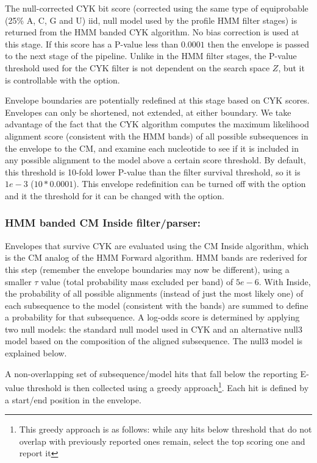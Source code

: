 \begin{sreoutput}
The null-corrected CYK bit score (corrected using the same type of
equiprobable (25\% A, C, G and U) iid, null model used by the profile
HMM filter stages) is returned from the HMM banded CYK algorithm. No
bias correction is used at this stage. If this score has a P-value
less than $0.0001$ then the envelope is passed to the next stage of
the pipeline. Unlike in the HMM filter stages, the P-value threshold
used for the CYK filter is not dependent on the search space $Z$, but
it is controllable with the  option.

Envelope boundaries are potentially redefined at this stage based on
CYK scores. Envelopes can only be shortened, not extended, at either
boundary. We take advantage of the fact that the CYK algorithm
computes the maximum likelihood alignment score (consistent with the
HMM bands) of all possible subsequences in the envelope to the CM, and
examine each nucleotide to see if it is included in any possible
alignment to the model above a certain score threshold. By default,
this threshold is 10-fold lower P-value than the filter survival
threshold, so it is $1e-3$ ($10*0.0001$). This envelope redefinition
can be turned off with the  option and it the
threshold for it can be changed with the  option.

\subsubsection{HMM banded CM Inside filter/parser:}

Envelopes that survive CYK are evaluated using the CM Inside
algorithm, which is the CM analog of the HMM Forward algorithm. HMM
bands are rederived for this step (remember the envelope boundaries
may now be different), using a smaller $\tau$ value (total probability
mass excluded per band) of $5e-6$. With Inside, the probability of all
possible alignments (instead of just the most likely one) of each
subsequence to the model (consistent with the bands) are summed to
define a probability for that subsequence. A log-odds score is
determined by applying two null models: the standard null model used
in CYK and an alternative null3 model based on the composition of the
aligned subsequence. The null3 model is explained below. 

A non-overlapping set of subsequence/model hits that fall below the
reporting E-value threshold is then collected using a greedy
approach\footnote{This greedy approach is as follows: while any hits
below threshold that do not overlap with previously reported ones
remain, select the top scoring one and report it}. Each hit is defined
by a start/end position in the envelope. 


\end{sreoutput}
